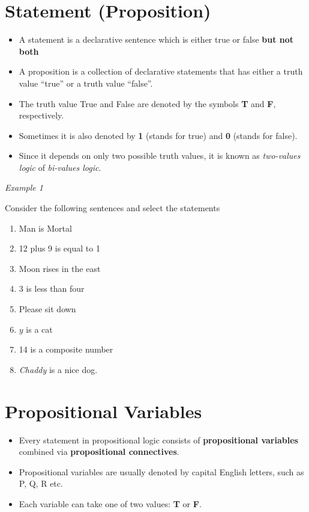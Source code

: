 \documentclass[]{book}
\providecommand{\tightlist}{%
  \setlength{\itemsep}{0pt}\setlength{\parskip}{0pt}}
\begin{document}

\hypertarget{statement-proposition}{%
\section{Statement (Proposition)}\label{statement-proposition}}

\begin{itemize}
\tightlist
\item
  A statement is a declarative sentence which is either true or false \textbf{but not both}
\item
  A proposition is a collection of declarative statements that has either a truth value ``true'' or a truth value ``false''.
\item
  The truth value True and False are denoted by the symbols \textbf{T} and \textbf{F}, respectively.
\item
  Sometimes it is also denoted by \textbf{1} (stands for true) and \textbf{0} (stands for false).
\item
  Since it depends on only two possible truth values, it is known as \emph{two-values logic} of \emph{bi-values logic}.
\end{itemize}

\emph{Example 1}

Consider the following sentences and select the statements

\begin{enumerate}
\def\labelenumi{(\alph{enumi})}
\tightlist
\item
  Man is Mortal 
\item
  12 plus 9 is equal to 1 
\item
  Moon rises in the east 
\item
  3 is less than four
\item
  Please sit down
\item
  \(y\) is a cat 
\item
  14 is a composite number 
\item
  \emph{Chaddy} is a nice dog.
\end{enumerate}

\hypertarget{propositional-variables}{%
\section{Propositional Variables}\label{propositional-variables}}

\begin{itemize}
\tightlist
\item
  Every statement in propositional logic consists
  of \textbf{propositional variables} combined via
  \textbf{propositional connectives}.
\item
  Propositional variables are usually denoted by capital English letters, such as P, Q, R etc.
\item
  Each variable can take one of two values: \textbf{T} or \textbf{F}.
\end{itemize}
\end{document}
